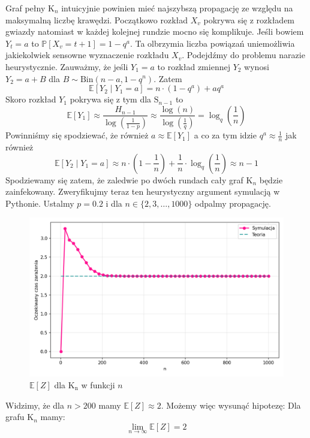 Graf pełny $\mathrm{K}_n$ intuicyjnie powinien mieć najszybszą propagację ze względu na maksymalną liczbę krawędzi. Początkowo rozkład $X_v$ pokrywa się z rozkładem gwiazdy natomiast w każdej kolejnej rundzie mocno się komplikuje. Jeśli bowiem $Y_t=a$ to $\mathbb{P}[X_v = t+1] = 1 - q^a$. Ta olbrzymia liczba powiązań uniemożliwia jakiekolwiek sensowne wyznaczenie rozkładu $X_v$. Podejdźmy do problemu narazie heurystycznie. Zauważmy, że jeśli $Y_1=a$ to rozkład zmiennej $Y_2$ wynosi $Y_2 = a + B$ dla $B \sim \mathrm{Bin}(n-a, 1-q^n)$. Zatem 
\[
    \mathbb{E}[Y_2\mid Y_1 = a] = n\cdot (1-q^a) + aq^a
\]
Skoro rozkład $Y_1$ pokrywa się z tym dla $\mathrm{S}_{n-1}$ to
\[
    \mathbb{E}[Y_1]\approx\frac{H_{n-1}}{\log(\frac{1}{1-p})} \approx \frac{\log(n)}{\log(\frac{1}{q})} = \log_{q}\left(\frac{1}{n}\right)
\]
Powinniśmy się spodziewać, że również $a \approx \mathbb{E}[Y_1]$ a co za tym idzie $q^a \approx \frac{1}{n}$ jak również
\[
    \mathbb{E}[Y_2\mid Y_1 = a] \approx n \cdot (1 - \frac{1}{n}) + \frac{1}{n} \cdot\log_{q}\left(\frac{1}{n}\right) \approx n - 1
\]
Spodziewamy się zatem, że zaledwie po dwóch rundach cały graf $\mathrm{K}_n$ będzie zainfekowany. Zweryfikujmy teraz ten heurystyczny argument symulacją w Pythonie. Ustalmy $p=0.2$ i dla $n\in\{2,3,\dots,1000\}$ odpalmy propagację. 
\begin{figure}[h!]
    \centering
    \includegraphics[width=1\textwidth]{../img/complete/full_infection_expectation.png}
    \caption{$\mathbb{E}[Z]$ dla $\mathrm{K_n}$ w funkcji $n$}
\end{figure}
Widzimy, że dla $n>200$ mamy $\mathbb{E}[Z] \approx 2$. Możemy więc wysunąć hipotezę: Dla grafu $\mathrm{K}_n$ mamy:
\[
    \lim_{n\to\infty} \mathbb{E}[Z] = 2
\]